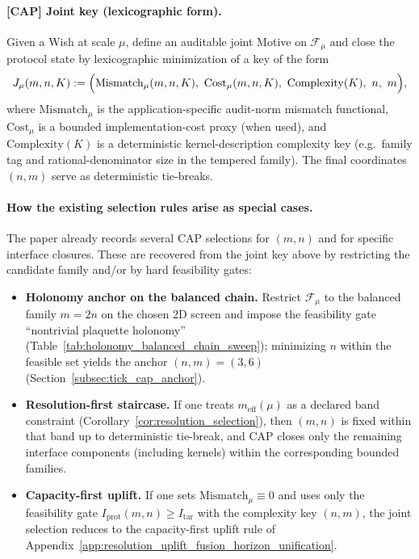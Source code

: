 \paragraph{[CAP] Joint key (lexicographic form).}
\AuditTag Given a Wish at scale $\mu$, define an auditable joint Motive on $\mathcal{F}_\mu$ and close the protocol state by lexicographic minimization of a key of the form
\[
J_\mu(m,n,K)
:=
\Bigl(
\mathrm{Mismatch}_\mu(m,n,K),\ 
\mathrm{Cost}_\mu(m,n,K),\ 
\mathrm{Complexity}(K),\ 
n,\ 
m
\Bigr),
\]
where $\mathrm{Mismatch}_\mu$ is the application-specific audit-norm mismatch functional, $\mathrm{Cost}_\mu$ is a bounded implementation-cost proxy (when used), and $\mathrm{Complexity}(K)$ is a deterministic kernel-description complexity key (e.g.\ family tag and rational-denominator size in the tempered family).
The final coordinates $(n,m)$ serve as deterministic tie-breaks.

\paragraph{How the existing selection rules arise as special cases.}
\AuditTag The paper already records several CAP selections for $(m,n)$ and for specific interface closures.
These are recovered from the joint key above by restricting the candidate family and/or by hard feasibility gates:
\begin{itemize}
\item \textbf{Holonomy anchor on the balanced chain.}
Restrict $\mathcal{F}_\mu$ to the balanced family $m=2n$ on the chosen $2$D screen and impose the feasibility gate ``nontrivial plaquette holonomy'' (Table~\ref{tab:holonomy_balanced_chain_sweep}); minimizing $n$ within the feasible set yields the anchor $(n,m)=(3,6)$ (Section~\ref{subsec:tick_cap_anchor}).
\item \textbf{Resolution-first staircase.}
If one treats $m_{\mathrm{eff}}(\mu)$ as a declared band constraint (Corollary~\ref{cor:resolution_selection}), then $(m,n)$ is fixed within that band up to deterministic tie-break, and CAP closes only the remaining interface components (including kernels) within the corresponding bounded families.
\item \textbf{Capacity-first uplift.}
If one sets $\mathrm{Mismatch}_\mu\equiv 0$ and uses only the feasibility gate $I_{\mathrm{prot}}(m,n)\ge I_{\mathrm{tar}}$ with the complexity key $(n,m)$, the joint selection reduces to the capacity-first uplift rule of Appendix~\ref{app:resolution_uplift_fusion_horizon_unification}.
\end{itemize}

